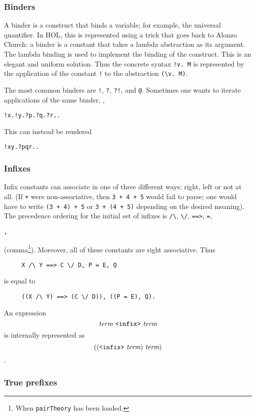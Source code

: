 {\subsubsection{Binders}

A binder is a construct that binds a variable; for example, the
universal quantifier. In HOL, this is represented using a trick that
goes back to Alonzo Church: a binder is a constant that takes a lambda
abstraction as its argument. The lambda binding is used to implement
the binding of the construct. This is an elegant and uniform solution.
Thus the concrete syntax \verb+!v. M+ is represented by the
application of the constant \verb+!+ to the abstraction \verb+(\v. M)+.

The most common binders are \verb+!+, \verb+?+, \verb+?!+, and
\verb+@+. Sometimes one wants to iterate applications of the same
binder, \eg,
\begin{alltt}
  !x. !y. ?p. ?q. ?r. \term.
\end{alltt}
This can instead be rendered
\begin{alltt}
  !x y. ?p q r. \term.
\end{alltt}

\subsubsection{Infixes}

Infix constants can associate in one of three different ways: right,
left or not at all.  (If \verb-+- were non-associative, then {\tt 3 +
  4 + 5} would fail to parse; one would have to write {\tt (3 + 4) +
  5} or {\tt 3 + (4 + 5)} depending on the desired meaning).  The
precedence ordering for the initial set of infixes is \verb+/\+,
\verb+\/+, \verb+==>+, \verb+=+,
 \begin{Large}\verb+,+\end{Large} (comma\footnote{When {\tt pairTheory} has
   been loaded.}). Moreover, all of these constants are right
 associative. Thus
\begin{verbatim}
     X /\ Y ==> C \/ D, P = E, Q
\end{verbatim}
 is equal to
\begin{verbatim}
     ((X /\ Y) ==> (C \/ D)), ((P = E), Q).
\end{verbatim}

\noindent An expression \[\term\ \verb+<infix>+\ \term\] is internally
represented as \[((\verb+<infix>+\ \term)\ \term)\].

\subsubsection{True prefixes}

}
